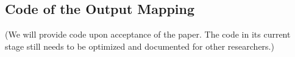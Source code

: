 \documentclass[11pt]{article}
\begin{document}


\subsection{Code of the Output Mapping}
\label{appendix-code-output}



(We will provide code upon acceptance of the paper. The code in its current stage still needs to be optimized and documented for other researchers.)

\end{document}
